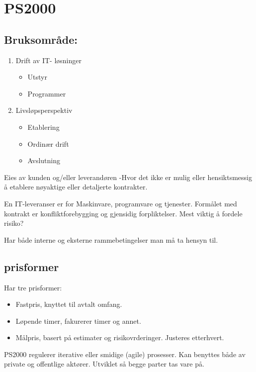 \documentclass[11pt]{article}
\begin{document}
\section{PS2000}
\label{sec-11}
\subsection{Bruksområde:}
\label{sec-11.1}

\begin{enumerate}
\item Drift av IT- løsninger

\begin{itemize}
\item Utstyr
\item Programmer
\end{itemize}

\item Livsløpsperspektiv

\begin{itemize}
\item Etablering
\item Ordinær drift
\item Avslutning
\end{itemize}

\end{enumerate}

   Eies av kunden og/eller leverandøren
   -Hvor det ikke er mulig eller hensiktsmessig å etablere nøyaktige eller detaljerte kontrakter.

   En IT-leveranser er for Maskinvare, programvare og tjenester.
   Formålet med kontrakt er konfliktforebygging og gjensidig forpliktelser.
   Mest viktig å fordele risiko?

   Har både interne og eksterne rammebetingelser man må ta hensyn til.
\subsection{prisformer}
\label{sec-11.2}

   Har tre prisformer: 
\begin{itemize}
\item Fastpris, knyttet til avtalt omfang.
\item Løpende timer, fakurerer timer og annet.
\item Målpris, basert på estimater og risikovrderinger. Justeres etterhvert.
\end{itemize}

   PS2000 regulerer iterative eller smidige (agile) prosesser. 
   Kan benyttes både av private og offentlige aktører. Utviklet så begge parter tas vare på.
\end{document}

